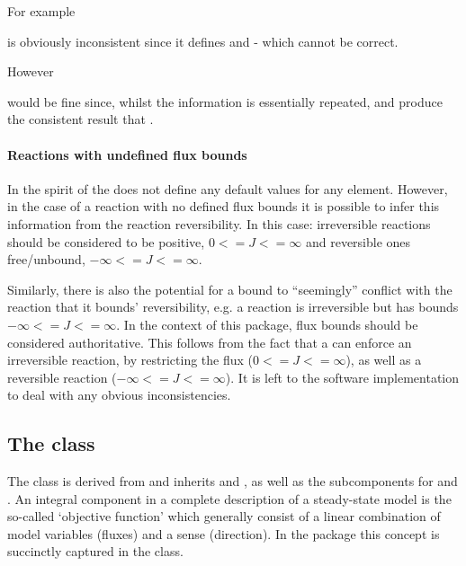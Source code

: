 For example


is obviously inconsistent since it defines  and  - which
cannot be correct.

However


would be fine since, whilst the information is essentially repeated, 
and  produce the consistent result that .



\paragraph{Reactions with undefined flux bounds}
In the spirit of \sbmlthreecore the \FBCPackage does not define any default values for any element. However, in the case of a reaction with no defined flux bounds it is possible to infer this information from the reaction reversibility. In this case: irreversible reactions should be considered to be positive, $0 <= J <= \infty$ and reversible ones free/unbound, $-\infty <= J <= \infty$.

Similarly, there is also the potential for a bound to ``seemingly'' conflict with the reaction that it bounds' reversibility, e.g. a reaction is irreversible but has bounds $-\infty <= J <= \infty$. In the context of this package, flux bounds should be considered authoritative. This follows from the fact that a \FluxBound can enforce an irreversible reaction, by restricting the flux ($0 <= J <= \infty$), as well as a reversible reaction ($-\infty <= J <= \infty$). It is left to the software implementation to deal with any obvious inconsistencies.


\subsection{The \FBC {} class}
\label{objective-class}
\label{listoffluxobjectives-class}

The \FBC \Objective class is derived from \SBML \SBase and inherits
 and , as well as the subcomponents for
\Annotation and \Notes. An integral component in a complete description
of a steady-state model is the so-called `objective function' which generally
consist of a linear combination of model variables (fluxes) and a sense
(direction). In the \FBC package this concept is succinctly captured in the
\Objective class.

